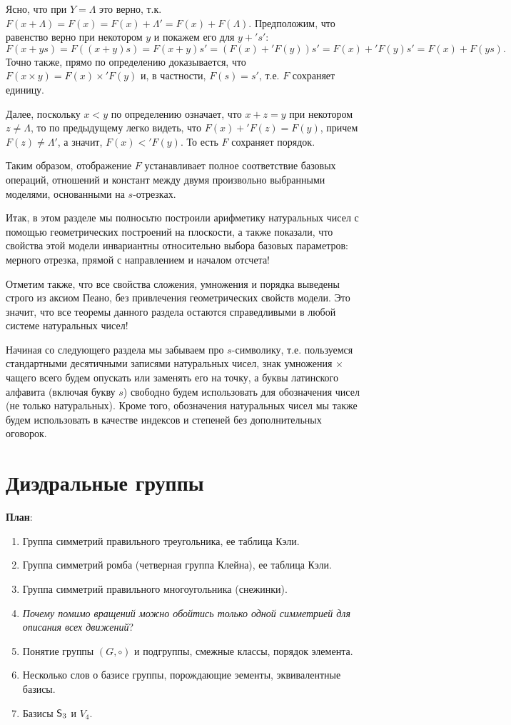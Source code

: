 Ясно, что при $Y=\Lambda$ это верно, т.к. $F(x+\Lambda)=F(x)=F(x)+\Lambda'=F(x)+F(\Lambda)$. Предположим, что равенство верно при некотором $y$ и покажем его для $y+'s'$:
$$
F(x+ys)=F((x+y)s)=F(x+y)s'=(F(x)+'F(y))s'=F(x)+'F(y)s'=F(x)+F(ys).
$$
Точно также, прямо по определению доказывается, что $F(x\times y)=F(x)\times'F(y)$ и, в частности, $F(s)=s'$, т.е. $F$ сохраняет единицу.

Далее, поскольку $x<y$ по определению означает, что $x+z=y$ при некотором $z\ne\Lambda$, то по предыдущему легко видеть, что $F(x)+'F(z)=F(y)$, причем $F(z)\ne\Lambda'$, а значит, $F(x)<'F(y)$. То есть $F$ сохраняет порядок.

Таким образом, отображение $F$ устанавливает полное соответствие базовых операций, отношений и констант между двумя произвольно выбранными моделями, основанными на $s$-отрезках.
\epf

Итак, в этом разделе мы полносьтю построили арифметику натуральных чисел с помощью геометрических построений на плоскости, а также показали, что свойства этой модели инвариантны относительно выбора базовых параметров: мерного отрезка, прямой с направлением и началом отсчета!

Отметим также, что все свойства сложения, умножения и порядка выведены строго из аксиом Пеано, без привлечения геометрических свойств модели. Это значит, что все теоремы данного раздела остаются справедливыми в любой системе натуральных чисел!

 Начиная со следующего раздела мы забываем про $s$-символику, т.е. пользуемся стандартными десятичными записями натуральных чисел, знак умножения $\times$ чащего всего будем опускать или заменять его на точку, а буквы латинского алфавита (включая букву $s$) свободно будем использовать для обозначения чисел (не только натуральных). Кроме того, обозначения натуральных чисел мы также будем использовать в качестве индексов и степеней без дополнительных оговорок.


\section{Диэдральные группы}


\textbf{План}:

\begin{enumerate}
\item Группа симметрий правильного треугольника, ее таблица Кэли.
\item Группа симметрий ромба (четверная группа Клейна), ее таблица Кэли.
\item Группа симметрий правильного многоугольника (снежинки).
\item \textit{Почему помимо вращений можно обойтись только одной симметрией для описания всех движений}?
\item Понятие группы $(G,\circ)$ и подгруппы, смежные классы, порядок элемента.
\item Несколько слов о базисе группы, порождающие эементы, эквивалентные базисы.
\item Базисы ${\mathsf{S}}_3$ и $V_4$.
\end{enumerate}

